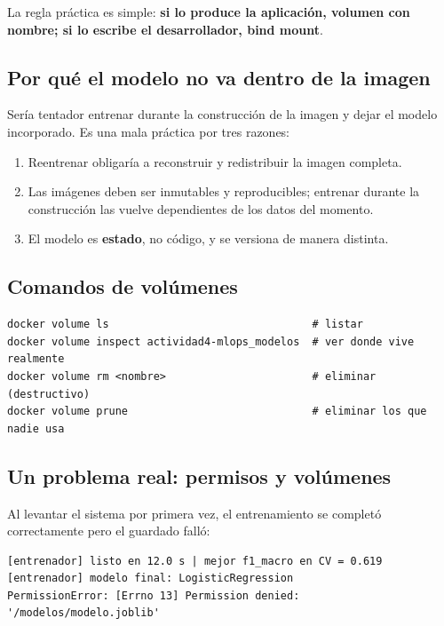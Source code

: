 \documentclass[12pt,a4paper]{article}
\begin{document}
La regla pr\'actica es simple: \textbf{si lo produce la aplicaci\'on, volumen con nombre; si lo
escribe el desarrollador, bind mount}.

\subsection{Por qu\'e el modelo no va dentro de la imagen}

Ser\'ia tentador entrenar durante la construcci\'on de la imagen y dejar el modelo incorporado. Es
una mala pr\'actica por tres razones:

\begin{enumerate}
\item Reentrenar obligar\'ia a reconstruir y redistribuir la imagen completa.
\item Las im\'agenes deben ser inmutables y reproducibles; entrenar durante la construcci\'on las
vuelve dependientes de los datos del momento.
\item El modelo es \textbf{estado}, no c\'odigo, y se versiona de manera distinta.
\end{enumerate}

\subsection{Comandos de vol\'umenes}

\begin{verbatim}
docker volume ls                                # listar
docker volume inspect actividad4-mlops_modelos  # ver donde vive realmente
docker volume rm <nombre>                       # eliminar (destructivo)
docker volume prune                             # eliminar los que nadie usa
\end{verbatim}

\subsection{Un problema real: permisos y vol\'umenes}

Al levantar el sistema por primera vez, el entrenamiento se complet\'o correctamente pero el
guardado fall\'o:

\begin{verbatim}
[entrenador] listo en 12.0 s | mejor f1_macro en CV = 0.619
[entrenador] modelo final: LogisticRegression
PermissionError: [Errno 13] Permission denied: '/modelos/modelo.joblib'
\end{verbatim}
\end{document}
